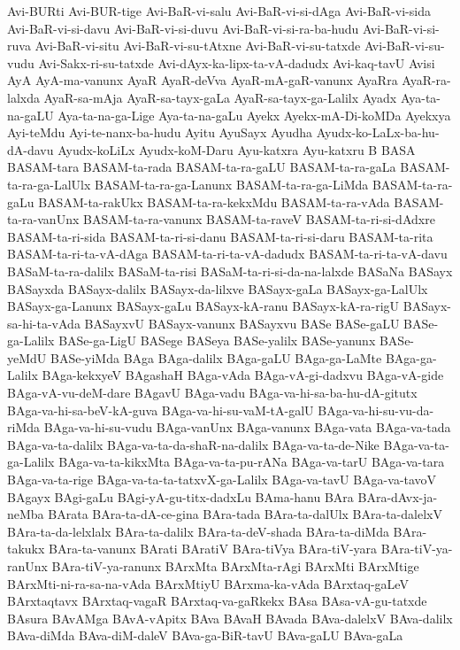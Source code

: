 {Avi-BURti
Avi-BUR-tige
Avi-BaR-vi-salu
Avi-BaR-vi-si-dAga
Avi-BaR-vi-sida
Avi-BaR-vi-si-davu
Avi-BaR-vi-si-duvu
Avi-BaR-vi-si-ra-ba-hudu
Avi-BaR-vi-si-ruva
Avi-BaR-vi-situ
Avi-BaR-vi-su-tAtxne
Avi-BaR-vi-su-tatxde
Avi-BaR-vi-su-vudu
Avi-Sakx-ri-su-tatxde
Avi-dAyx-ka-lipx-ta-vA-dadudx
Avi-kaq-tavU
Avisi
AyA
AyA-ma-vanunx
AyaR
AyaR-deVva
AyaR-mA-gaR-vanunx
AyaRra
AyaR-ra-lalxda
AyaR-sa-mAja
AyaR-sa-tayx-gaLa
AyaR-sa-tayx-ga-Lalilx
Ayadx
Aya-ta-na-gaLU
Aya-ta-na-ga-Lige
Aya-ta-na-gaLu
Ayekx
Ayekx-mA-Di-koMDa
Ayekxya
Ayi-teMdu
Ayi-te-nanx-ba-hudu
Ayitu
AyuSayx
Ayudha
Ayudx-ko-LaLx-ba-hu-dA-davu
Ayudx-koLiLx
Ayudx-koM-Daru
Ayu-katxra
Ayu-katxru
B
BASA
BASAM-tara
BASAM-ta-rada
BASAM-ta-ra-gaLU
BASAM-ta-ra-gaLa
BASAM-ta-ra-ga-LalUlx
BASAM-ta-ra-ga-Lanunx
BASAM-ta-ra-ga-LiMda
BASAM-ta-ra-gaLu
BASAM-ta-rakUkx
BASAM-ta-ra-kekxMdu
BASAM-ta-ra-vAda
BASAM-ta-ra-vanUnx
BASAM-ta-ra-vanunx
BASAM-ta-raveV
BASAM-ta-ri-si-dAdxre
BASAM-ta-ri-sida
BASAM-ta-ri-si-danu
BASAM-ta-ri-si-daru
BASAM-ta-rita
BASAM-ta-ri-ta-vA-dAga
BASAM-ta-ri-ta-vA-dadudx
BASAM-ta-ri-ta-vA-davu
BASaM-ta-ra-dalilx
BASaM-ta-risi
BASaM-ta-ri-si-da-na-lalxde
BASaNa
BASayx
BASayxda
BASayx-dalilx
BASayx-da-lilxve
BASayx-gaLa
BASayx-ga-LalUlx
BASayx-ga-Lanunx
BASayx-gaLu
BASayx-kA-ranu
BASayx-kA-ra-rigU
BASayx-sa-hi-ta-vAda
BASayxvU
BASayx-vanunx
BASayxvu
BASe
BASe-gaLU
BASe-ga-Lalilx
BASe-ga-LigU
BASege
BASeya
BASe-yalilx
BASe-yanunx
BASe-yeMdU
BASe-yiMda
BAga
BAga-dalilx
BAga-gaLU
BAga-ga-LaMte
BAga-ga-Lalilx
BAga-kekxyeV
BAgashaH
BAga-vAda
BAga-vA-gi-dadxvu
BAga-vA-gide
BAga-vA-vu-deM-dare
BAgavU
BAga-vadu
BAga-va-hi-sa-ba-hu-dA-gitutx
BAga-va-hi-sa-beV-kA-guva
BAga-va-hi-su-vaM-tA-galU
BAga-va-hi-su-vu-da-riMda
BAga-va-hi-su-vudu
BAga-vanUnx
BAga-vanunx
BAga-vata
BAga-va-tada
BAga-va-ta-dalilx
BAga-va-ta-da-shaR-na-dalilx
BAga-va-ta-de-Nike
BAga-va-ta-ga-Lalilx
BAga-va-ta-kikxMta
BAga-va-ta-pu-rANa
BAga-va-tarU
BAga-va-tara
BAga-va-ta-rige
BAga-va-ta-ta-tatxvX-ga-Lalilx
BAga-va-tavU
BAga-va-tavoV
BAgayx
BAgi-gaLu
BAgi-yA-gu-titx-dadxLu
BAma-hanu
BAra
BAra-dAvx-ja-neMba
BArata
BAra-ta-dA-ce-gina
BAra-tada
BAra-ta-dalUlx
BAra-ta-dalelxV
BAra-ta-da-lelxlalx
BAra-ta-dalilx
BAra-ta-deV-shada
BAra-ta-diMda
BAra-takukx
BAra-ta-vanunx
BArati
BAratiV
BAra-tiVya
BAra-tiV-yara
BAra-tiV-ya-ranUnx
BAra-tiV-ya-ranunx
BArxMta
BArxMta-rAgi
BArxMti
BArxMtige
BArxMti-ni-ra-sa-na-vAda
BArxMtiyU
BArxma-ka-vAda
BArxtaq-gaLeV
BArxtaqtavx
BArxtaq-vagaR
BArxtaq-va-gaRkekx
BAsa
BAsa-vA-gu-tatxde
BAsura
BAvAMga
BAvA-vApitx
BAva
BAvaH
BAvada
BAva-dalelxV
BAva-dalilx
BAva-diMda
BAva-diM-daleV
BAva-ga-BiR-tavU
BAva-gaLU
BAva-gaLa
}
